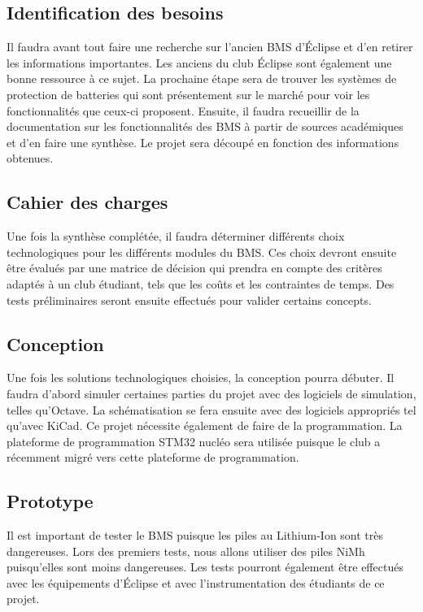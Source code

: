 \subsection{Identification des besoins}
Il faudra avant tout faire une recherche sur l’ancien BMS d’Éclipse et d’en retirer les informations importantes. Les anciens du club Éclipse sont également une bonne ressource à ce sujet. La prochaine étape sera de trouver les systèmes de protection de batteries qui sont présentement sur le marché pour voir les fonctionnalités que ceux-ci proposent. Ensuite, il faudra recueillir de la documentation sur les fonctionnalités des BMS à partir de sources académiques et d’en faire une synthèse. Le projet sera découpé en fonction des informations obtenues. 

\subsection{Cahier des charges}
Une fois la synthèse complétée, il faudra déterminer différents choix technologiques pour les différents modules du BMS. Ces choix devront ensuite être évalués par une matrice de décision qui prendra en compte des critères adaptés à un club étudiant, tels que les coûts et les contraintes de temps. Des tests préliminaires seront ensuite effectués pour valider certains concepts.

\subsection{Conception}
Une fois les solutions technologiques choisies, la conception pourra débuter. Il faudra d’abord simuler certaines parties du projet avec des logiciels de simulation, telles qu’Octave. La schématisation se fera ensuite avec des logiciels appropriés tel qu’avec KiCad. Ce projet nécessite également de faire de la programmation. La plateforme de programmation STM32 nucléo sera utilisée puisque le club a récemment migré vers cette plateforme de programmation.

\subsection{Prototype}
Il est important de tester le BMS puisque les piles au Lithium-Ion sont très dangereuses. Lors des premiers tests, nous allons utiliser des piles NiMh puisqu’elles sont moins dangereuses. Les tests pourront également être effectués avec les équipements d’Éclipse et avec l’instrumentation des étudiants de ce projet.
